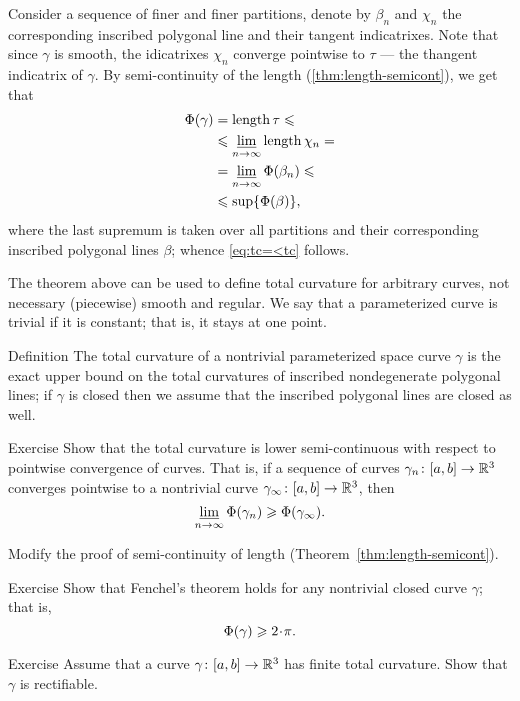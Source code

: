 Consider a sequence of finer and finer partitions, denote by $\beta_n$ and $\chi_n$ the corresponding inscribed polygonal line and their tangent indicatrixes.
Note that since $\gamma$ is smooth, the idicatrixes $\chi_n$ converge pointwise to $\tau$ --- the thangent indicatrix of $\gamma$.
By semi-continuity of the length (\ref{thm:length-semicont}), we get that  
\begin{align*}
\Phi({\gamma})&=\mathop{\rm length}\nolimits \tau\leqslant  
\\
&\leqslant \varliminf_{n\to\infty}\mathop{\rm length}\nolimits \chi_n=
\\
&= \varliminf_{n\to\infty}\Phi({\beta_n})\leqslant
\\
&\leqslant \sup\{\Phi({\beta})\},
\end{align*}
where the last supremum is taken over all partitions and their corresponding inscribed polygonal lines $\beta$; whence \ref{eq:tc=<tc} follows.
\qeds

The theorem above can be used to define total curvature for arbitrary curves, not necessary (piecewise) smooth and regular. 
We say that a parameterized curve is trivial if it is constant; that is, it stays at one point.

\begin{thm}{Definition}\label{def:total-curv-poly}
The total curvature of a nontrivial parameterized space curve $\gamma$ is the exact upper bound on the total curvatures of inscribed nondegenerate polygonal lines;
if $\gamma$ is closed then we assume that the inscribed polygonal lines are closed as well.
\end{thm}


\begin{thm}{Exercise}
Show that the total curvature is lower semi-continuous with respect to pointwise convergence of curves.
That is, if a sequence
of curves $\gamma_n\colon[a,b]\to \mathbb{R}^3$ converges pointwise 
to a nontrivial curve $\gamma_\infty\:[a,b]\z\to \RR^3$, then 
\[\varliminf_{n\to\infty} \Phi({\gamma_n}) \geqslant \Phi({\gamma_\infty}).\]
\end{thm}

 Modify the proof of semi-continuity of length (Theorem~\ref{thm:length-semicont}).

\begin{thm}{Exercise}
Show that Fenchel's theorem holds for any nontrivial closed curve $\gamma$;
that is, 
\[\tc\gamma\ge2\cdot\pi.\]
\end{thm}

\begin{thm}{Exercise} 
Assume that a curve $\gamma\colon[a,b]\to\mathbb{R}^3$ has finite total curvature.
 Show that $\gamma$ is rectifiable.
\end{thm}
